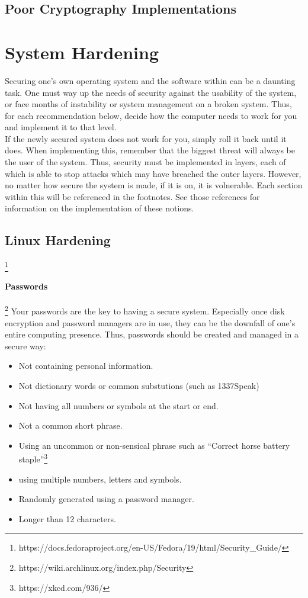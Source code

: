 \documentclass[a4paper,11pt,draft]{article}
\begin{document}
	\subsection{Poor Cryptography Implementations}
\section{System Hardening}
	Securing one's own operating system and the software within can be a daunting task. 
	One must way up the needs of security against the usability of the system, or face months of instability or system management on a broken system. 
	Thus, for each recommendation below, decide how the computer needs to work for you and implement it to that level.\\ 
	If the newly secured system does not work for you, simply roll it back until it does. 
	When implementing this, remember that the biggest threat will always be the user of the system. 
	Thus, security must be implemented in layers, each of which is able to stop attacks which may have breached the outer layers. However, no matter how secure the system is made, if it is on, it is volnerable. 
	Each section within this will be referenced in the footnotes. See those references for information on the implementation of these notions. 
	\subsection{Linux Hardening} \footnote{https://docs.fedoraproject.org/en-US/Fedora/19/html/Security\_Guide/}
		\paragraph{Passwords} \footnote{https://wiki.archlinux.org/index.php/Security}
			Your passwords are the key to having a secure system. 
			Especially once disk encryption and password managers are in use, they can be the downfall of one's entire computing presence. 
			Thus, passwords should be created and managed in a secure way:
			\begin{itemize}
				\item Not containing personal information.
				\item Not dictionary words or common substutions (such as 1337Speak)
				\item Not having all numbers or symbols at the start or end. 
				\item Not a common short phrase. 
				\item Using an uncommon or non-sensical phrase such as ``Correct horse battery staple''\footnote{https://xkcd.com/936/}
				\item using multiple numbers, letters and symbols. 
				\item Randomly generated using a password manager. %
				\item Longer than 12 characters. 
			\end{itemize}
\end{document}
